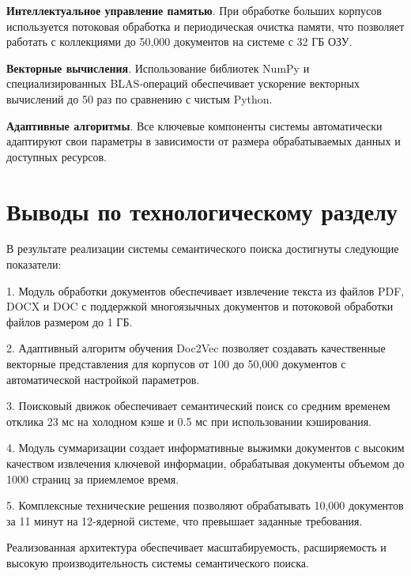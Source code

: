 \textbf{Интеллектуальное управление памятью}. При обработке больших корпусов используется потоковая обработка и периодическая очистка памяти, что позволяет работать с коллекциями до 50,000 документов на системе с 32 ГБ ОЗУ.

\textbf{Векторные вычисления}. Использование библиотек NumPy и специализированных BLAS-операций обеспечивает ускорение векторных вычислений до 50 раз по сравнению с чистым Python.

\textbf{Адаптивные алгоритмы}. Все ключевые компоненты системы автоматически адаптируют свои параметры в зависимости от размера обрабатываемых данных и доступных ресурсов.

\section{Выводы по технологическому разделу}

В результате реализации системы семантического поиска достигнуты следующие показатели:

1. Модуль обработки документов обеспечивает извлечение текста из файлов PDF, DOCX и DOC с поддержкой многоязычных документов и потоковой обработки файлов размером до 1 ГБ.

2. Адаптивный алгоритм обучения Doc2Vec позволяет создавать качественные векторные представления для корпусов от 100 до 50,000 документов с автоматической настройкой параметров.

3. Поисковый движок обеспечивает семантический поиск со средним временем отклика 23 мс на холодном кэше и 0.5 мс при использовании кэширования.

4. Модуль суммаризации создает информативные выжимки документов с высоким качеством извлечения ключевой информации, обрабатывая документы объемом до 1000 страниц за приемлемое время.

5. Комплексные технические решения позволяют обрабатывать 10,000 документов за 11 минут на 12-ядерной системе, что превышает заданные требования.

Реализованная архитектура обеспечивает масштабируемость, расширяемость и высокую производительность системы семантического поиска.
